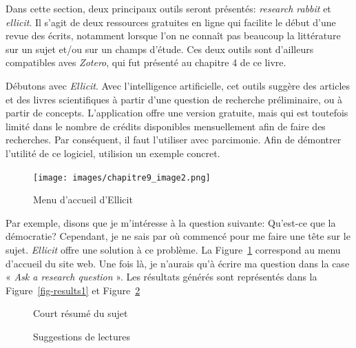 \documentclass[
  letterpaper,
  DIV=11,
  numbers=noendperiod]{scrreprt}
\begin{document}
Dans cette section, deux principaux outils seront présentés:
\emph{research rabbit} et \emph{ellicit}. Il s'agit de deux ressources
gratuites en ligne qui facilite le début d'une revue des écrits,
notamment lorsque l'on ne connaît pas beaucoup la littérature sur un
sujet et/ou sur un champs d'étude. Ces deux outils sont d'ailleurs
compatibles aves \emph{Zotero}, qui fut présenté au chapitre 4 de ce
livre.

Débutons avec \emph{Ellicit}. Avec l'intelligence artificielle, cet
outils suggère des articles et des livres scientifiques à partir d'une
question de recherche préliminaire, ou à partir de concepts.
L'application offre une version gratuite, mais qui est toutefois limité
dans le nombre de crédits disponibles mensuellement afin de faire des
recherches. Par conséquent, il faut l'utiliser avec parcimonie. Afin de
démontrer l'utilité de ce logiciel, utilision un exemple concret.

\begin{figure}

{\centering \texttt{[image: images/chapitre9\_image2.png]}

}

\caption{\label{fig-ellicit}Menu d'accueil d'Ellicit}

\end{figure}

Par exemple, disons que je m'intéresse à la question suivante: Qu'est-ce
que la démocratie? Cependant, je ne sais par où commencé pour me faire
une tête sur le sujet. \emph{Ellicit} offre une solution à ce problème.
La Figure~\ref{fig-ellicit} correspond au menu d'accueil du site web.
Une fois là, je n'aurais qu'à écrire ma question dans la case «
\emph{Ask a research question} ». Les résultats générés sont représentés
dans la Figure~\ref{fig-results1} et Figure~\ref{fig-results2}

\begin{figure}

\begin{minipage}[t]{0.50\linewidth}

{\centering 


\caption{\label{fig-results1}Court résumé du sujet}

}

\end{minipage}%
%
\begin{minipage}[t]{0.50\linewidth}

{\centering 


\caption{\label{fig-results2}Suggestions de lectures}

}

\end{minipage}%

\end{figure}
\end{document}
